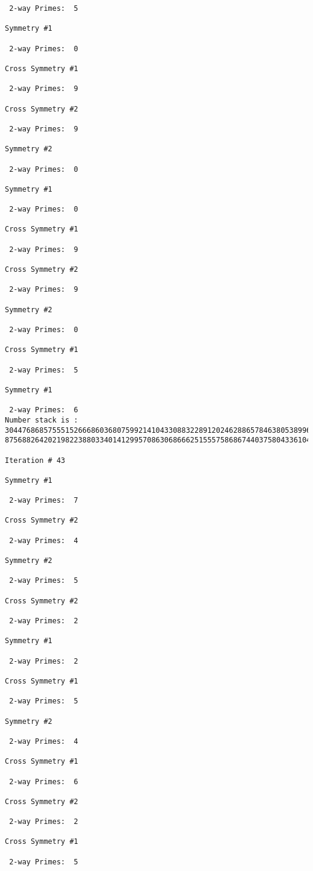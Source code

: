 {{{{\begin{verbatim}
 2-way Primes: 	5

Symmetry #1

 2-way Primes: 	0

Cross Symmetry #1

 2-way Primes: 	9

Cross Symmetry #2

 2-way Primes: 	9

Symmetry #2

 2-way Primes: 	0

Symmetry #1

 2-way Primes: 	0

Cross Symmetry #1

 2-way Primes: 	9

Cross Symmetry #2

 2-way Primes: 	9

Symmetry #2

 2-way Primes: 	0

Cross Symmetry #1

 2-way Primes: 	5

Symmetry #1

 2-way Primes: 	6
Number stack is :
30447686857555152666860368075992141043308832289120246288657846380538996794608835958544046240163340857
87568826420219822388033401412995708630686662515557586867440375804336104264044585953880649769983508364

Iteration #	43

Symmetry #1

 2-way Primes: 	7

Cross Symmetry #2

 2-way Primes: 	4

Symmetry #2

 2-way Primes: 	5

Cross Symmetry #2

 2-way Primes: 	2

Symmetry #1

 2-way Primes: 	2

Cross Symmetry #1

 2-way Primes: 	5

Symmetry #2

 2-way Primes: 	4

Cross Symmetry #1

 2-way Primes: 	6

Cross Symmetry #2

 2-way Primes: 	2

Cross Symmetry #1

 2-way Primes: 	5


\end{verbatim}}}}}

